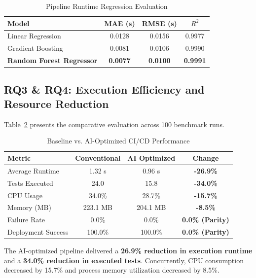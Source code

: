 \documentclass[conference]{IEEEtran}
\begin{document}
\begin{table}[htbp]
\caption{Pipeline Runtime Regression Evaluation}
\begin{center}
\begin{tabular}{lccc}
\toprule
\textbf{Model} & \textbf{MAE (s)} & \textbf{RMSE (s)} & \textbf{$R^2$} \\
\midrule
Linear Regression & 0.0128 & 0.0156 & 0.9977 \\
Gradient Boosting & 0.0081 & 0.0106 & 0.9990 \\
\textbf{Random Forest Regressor} & \textbf{0.0077} & \textbf{0.0100} & \textbf{0.9991} \\
\bottomrule
\end{tabular}
\label{tab:runtime_models}
\end{center}
\end{table}

\subsection{RQ3 \& RQ4: Execution Efficiency and Resource Reduction}
Table~\ref{tab:comparison} presents the comparative evaluation across 100 benchmark runs.

\begin{table}[htbp]
\caption{Baseline vs. AI-Optimized CI/CD Performance}
\begin{center}
\begin{tabular}{lccc}
\toprule
\textbf{Metric} & \textbf{Conventional} & \textbf{AI Optimized} & \textbf{Change} \\
\midrule
Average Runtime & 1.32 s & 0.96 s & \textbf{-26.9\%} \\
Tests Executed & 24.0 & 15.8 & \textbf{-34.0\%} \\
CPU Usage & 34.0\% & 28.7\% & \textbf{-15.7\%} \\
Memory (MB) & 223.1 MB & 204.1 MB & \textbf{-8.5\%} \\
Failure Rate & 0.0\% & 0.0\% & \textbf{0.0\% (Parity)} \\
Deployment Success & 100.0\% & 100.0\% & \textbf{0.0\% (Parity)} \\
\bottomrule
\end{tabular}
\label{tab:comparison}
\end{center}
\end{table}

The AI-optimized pipeline delivered a \textbf{26.9\% reduction in execution runtime} and a \textbf{34.0\% reduction in executed tests}. Concurrently, CPU consumption decreased by 15.7\% and process memory utilization decreased by 8.5\%.
\end{document}
